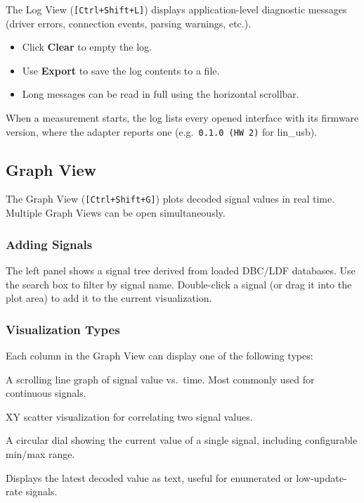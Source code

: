 \documentclass[a4paper,11pt]{article}
\newcommand{\key}[1]{\texttt{\small[#1]}}
\newcommand{\ui}[1]{\textbf{#1}}
\begin{document}
The Log View (\key{Ctrl+Shift+L}) displays application-level diagnostic messages
(driver errors, connection events, parsing warnings, etc.).

\begin{itemize}
  \item Click \ui{Clear} to empty the log.
  \item Use \ui{Export} to save the log contents to a file.
  \item Long messages can be read in full using the horizontal scrollbar.
\end{itemize}

When a measurement starts, the log lists every opened interface with its firmware
version, where the adapter reports one (e.g.\ \texttt{0.1.0 (HW 2)} for lin\_usb).

\subsection{Graph View}
\label{sec:graph}

The Graph View (\key{Ctrl+Shift+G}) plots decoded signal values in real time.
Multiple Graph Views can be open simultaneously.

\subsubsection{Adding Signals}

The left panel shows a signal tree derived from loaded DBC/LDF databases.
Use the search box to filter by signal name. Double-click a signal (or drag it into
the plot area) to add it to the current visualization.

\subsubsection{Visualization Types}

Each column in the Graph View can display one of the following types:

\begin{description}[leftmargin=2em, style=nextline]
  \item[Time Series] A scrolling line graph of signal value vs.\ time. Most
        commonly used for continuous signals.
  \item[Scatter Plot] XY scatter visualization for correlating two signal values.
  \item[Gauge] A circular dial showing the current value of a single signal,
        including configurable min/max range.
  \item[Text] Displays the latest decoded value as text, useful for enumerated
        or low-update-rate signals.
\end{description}
\end{document}
